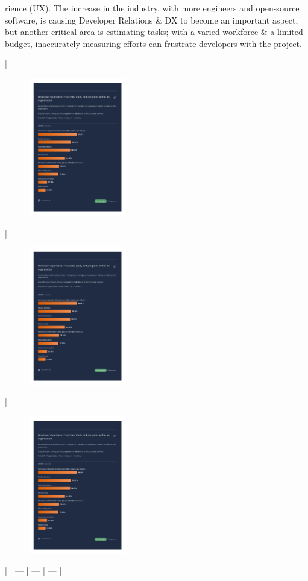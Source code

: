 \documentclass[]{beamer}
\begin{document}
\begin{frame}[fragile]
\begin{markdown}
rience (UX). The increase in the industry, with more engineers and open-source software, is \textcolor{vsgreen}{causing Developer Relations \& DX to become an important aspect}, but another critical area is estimating tasks; with a varied workforce \& a limited budget, inaccurately measuring efforts can frustrate developers with the project.

\vspace{-0.5cm}

| \begin{figure}\includegraphics[width=0.38\textwidth,trim={0 20cm 0 2cm},clip]{Stack Overflow Developer Survey 2022.pdf}\end{figure} | \begin{figure}\includegraphics[width=0.38\textwidth,trim={0 13.5cm 0 9cm},clip]{Stack Overflow Developer Survey 2022.pdf}\end{figure} | \begin{figure}\includegraphics[width=0.38\textwidth,trim={0 6.5cm 0 16cm},clip]{Stack Overflow Developer Survey 2022.pdf}\end{figure} |
| --- | --- | --- |


\end{markdown}
\end{frame}
\end{document}
